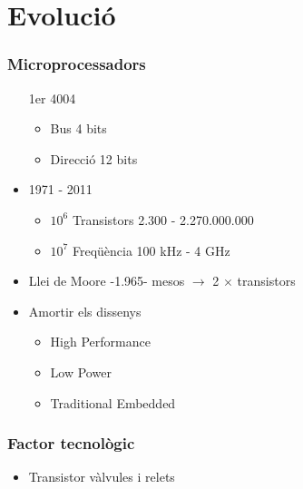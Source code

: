 \documentclass[a4paper,10pt]{article}
\newcommand{\blue}[1]{{\color{blue}#1}}
\newcommand{\red}[1]{{\color{red}#1}}
\begin{document}
\part{\red{E}volució}
\section{Microprocessadors}
\begin{itemize}
\item[1er] 4004
	\begin{itemize}
	\item Bus 4 bits
	\item Direcció 12 bits
	\end{itemize}
\item 1971 - 2011
	\begin{itemize}
	\item $10^6$ Transistors \blue{2.300 - 2.270.000.000}
	\item $10^7$ Freqüència \blue{100 kHz - 4 GHz}
	\end{itemize}
\item Llei de Moore -1.965-
	 mesos $\to$  2 $\times$ transistors
\item Amortir els dissenys
	\begin{itemize}
	\item High Performance
	\item Low Power
	\item Traditional Embedded
	\end{itemize}
\end{itemize}

\section{Factor tecnològic}
\begin{itemize}
\item Transistor \blue{vàlvules i} \red{relets}
\end{itemize}
\end{document}
